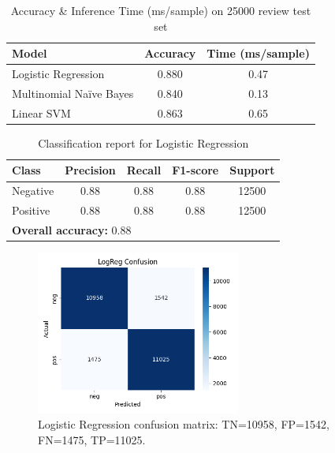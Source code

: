 \documentclass[12pt,a4paper]{article}
\begin{document}
\begin{table}[H]
  \centering
  \caption{Accuracy \& Inference Time (ms/sample) on 25000 review test set}
  \label{tab:classical-summary}
  \begin{tabular}{lcc}
    \toprule
    \textbf{Model}          & \textbf{Accuracy} & \textbf{Time (ms/sample)} \\
    \midrule
    Logistic Regression     & 0.880             & 0.47                     \\
    Multinomial Naïve Bayes & 0.840             & 0.13                     \\
    Linear SVM              & 0.863             & 0.65                     \\
    \bottomrule
  \end{tabular}
\end{table}

\begin{table}[H]
  \centering
  \caption{Classification report for Logistic Regression}
  \label{tab:clf-report}
  \begin{tabular}{lcccc}
    \toprule
    \textbf{Class} & \textbf{Precision} & \textbf{Recall} & \textbf{F1-score} & \textbf{Support} \\
    \midrule
    Negative & 0.88 & 0.88 & 0.88 & 12500 \\
    Positive & 0.88 & 0.88 & 0.88 & 12500 \\
    \midrule
    \multicolumn{5}{l}{\textbf{Overall accuracy:} 0.88} \\
    \bottomrule
  \end{tabular}
\end{table}

\begin{figure}[H]
  \centering
  \includegraphics[width=0.6\textwidth]{figures/LogReg_confusion.png}
  \caption{Logistic Regression confusion matrix: TN=10958, FP=1542, FN=1475, TP=11025.}
  \label{fig:confusion_matrix_logreg}
\end{figure}
\end{document}
